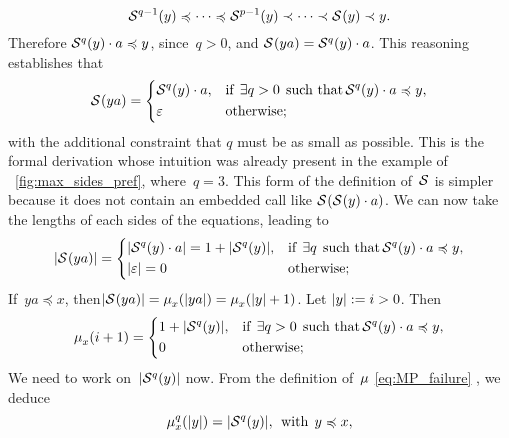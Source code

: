 \[
\mathcal{S}^{q-1}(y) \preccurlyeq \dots \preccurlyeq \mathcal{S}^{p-1}(y) \prec
\dots \prec \mathcal{S}^{}(y) \prec y.
\]
Therefore \(\mathcal{S}^{q}(y) \cdot a \preccurlyeq y\), since~\({q > 0}\),
and \(\mathcal{S}^{}(ya) = \mathcal{S}^{q}(y) \cdot a\). This reasoning
establishes that
\begin{equation}
\mathcal{S}^{}(ya) = 
\left\{
  \begin{aligned}
   & \mathcal{S}^{q}(y) \cdot a,
   && \text{if} \,\; \exists q>0 \,\; \text{such that} \,
    \mathcal{S}^{q}(y) \cdot a \preccurlyeq y,\\
   & \varepsilon 
   && \text{otherwise;}
  \end{aligned}
\right.
\label{eq:B_p}
\end{equation}
with the additional constraint that \(q\) must be as small as
possible. This is the formal derivation whose intuition was already
present in the example of \fig~\vref{fig:max_sides_pref},
where~\({q=3}\). This form of the definition of~\(\mathcal{S}\) is
simpler because it does not contain an embedded call like
\(\mathcal{S}^{}(\mathcal{S}^{}(y) \cdot a)\). We can now take the lengths of
each sides of the equations, leading to
\begin{equation*}
\lvert{\mathcal{S}^{}(ya)}\lvert{} = 
\left\{
  \begin{aligned}
   & \lvert{\mathcal{S}^{q}(y) \cdot a}\lvert{} = 1 + \lvert{\mathcal{S}^{q}(y)}\lvert{},
   && \text{if} \,\; \exists q \,\; \text{such that} \,
    \mathcal{S}^{q}(y) \cdot a \preccurlyeq y,\\
   & \lvert{\varepsilon}\lvert{} = 0
   && \text{otherwise;}
  \end{aligned}
\right.
\end{equation*}
If~\({ya \preccurlyeq x}\), then\(\lvert{\mathcal{S}^{}(ya)}\lvert{} =
\mu_{x}^{}(\lvert{ya}\lvert{}) = \mu_{x}^{}(\lvert{y}\lvert{}+1)\). Let
\({\lvert{y}\lvert{} := i > 0}\). Then
\begin{equation*}
\mu_{x}^{}(i+1) =
\left\{
  \begin{aligned}
   & 1 + \lvert{\mathcal{S}^{q}(y)}\lvert{},
   && \text{if} \,\; \exists q>0 \,\; \text{such that} \,
    \mathcal{S}^{q}(y) \cdot a \preccurlyeq y,\\
   & 0
   && \text{otherwise;}
  \end{aligned}
\right.
\end{equation*}
We need to work on~\(\lvert{\mathcal{S}^{q}(y)}\lvert{}\) now. From the definition
of~\(\mu\) \eqref{eq:MP_failure} ,
we deduce
\begin{equation}
\mu_{x}^{q}(\lvert{y}\lvert{}) = \lvert{\mathcal{S}^{q}(y)}\lvert{},
\,\; \text{with} \,\; y \preccurlyeq x,
\label{eq:MP_failure_p}
\end{equation}
